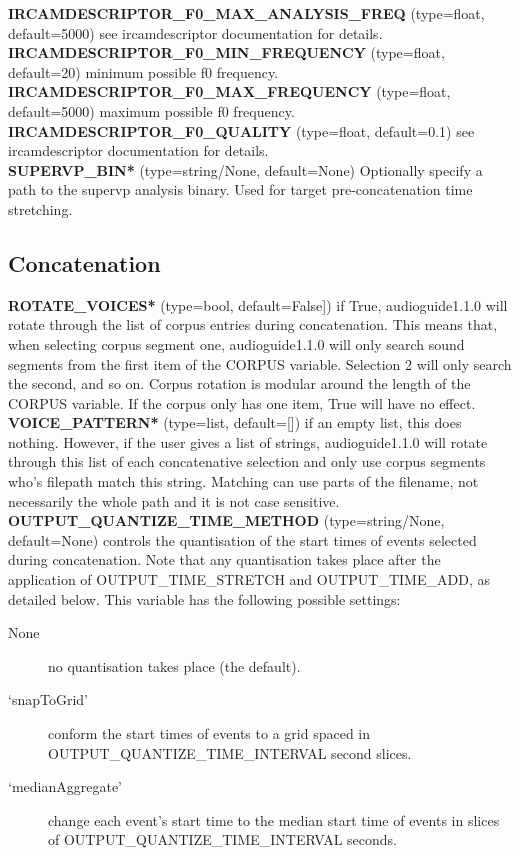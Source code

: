 \documentclass{article}
\newcommand{\optEntry}[4]{\textbf{#1} (type={\color{red}#2}, default={\color{ForestGreen}#3}) #4\hspace{0.5em}\\}
\newcommand{\ag}{audioguide1.1.0\xspace}
\begin{document}
\begin{spacing}{1.2}
\optEntry{IRCAMDESCRIPTOR\_F0\_MAX\_ANALYSIS\_FREQ}{float}{5000}{see ircamdescriptor documentation for details.}

\optEntry{IRCAMDESCRIPTOR\_F0\_MIN\_FREQUENCY}{float}{20}{minimum possible f0 frequency.}

\optEntry{IRCAMDESCRIPTOR\_F0\_MAX\_FREQUENCY}{float}{5000}{maximum possible f0 frequency.}

\optEntry{IRCAMDESCRIPTOR\_F0\_QUALITY}{float}{0.1}{see ircamdescriptor documentation for details.}

\optEntry{SUPERVP\_BIN*}{string/None}{None}{Optionally specify a path to the supervp analysis binary.  Used for target pre-concatenation time stretching.}



\subsection{Concatenation}
\optEntry{ROTATE\_VOICES*}{bool}{False]}{if True, \ag will rotate through the list of corpus entries during concatenation.  This means that, when selecting corpus segment one, \ag will only search sound segments from the first item of the CORPUS variable.  Selection 2 will only search the second, and so on.  Corpus rotation is modular around the length of the CORPUS variable.  If the corpus only has one item, True will have no effect.}

\optEntry{VOICE\_PATTERN*}{list}{[]}{if an empty list, this does nothing.  However, if the user gives a list of strings, \ag will rotate through this list of each concatenative selection and only use corpus segments who's filepath match this string.  Matching can use parts of the filename, not necessarily the whole path and it is not case sensitive.}

\optEntry{OUTPUT\_QUANTIZE\_TIME\_METHOD}{string/None}{None}{controls the quantisation of the start times of events selected during concatenation.  Note that any quantisation takes place after the application of OUTPUT\_TIME\_STRETCH and OUTPUT\_TIME\_ADD, as detailed below.  This variable has the following possible settings:
\begin{description}
\item[None] no quantisation takes place (the default).
\item[`snapToGrid'] conform the start times of events to a grid spaced in OUTPUT\_QUANTIZE\_TIME\_INTERVAL second slices.
\item[`medianAggregate'] change each event's start time to the median start time of events in slices of OUTPUT\_QUANTIZE\_TIME\_INTERVAL seconds.  
\end{description}
}


\end{spacing}
\end{document}

